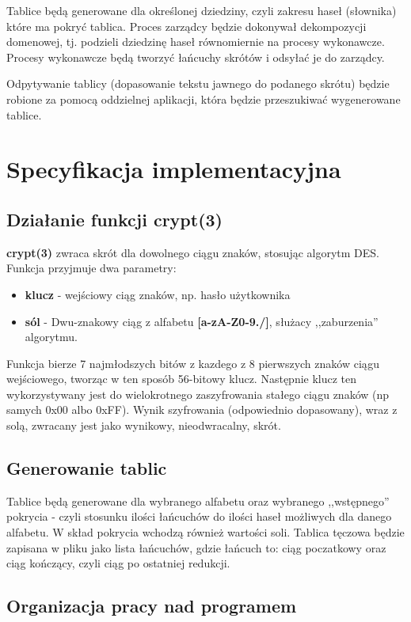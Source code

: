 \documentclass[a4paper,11pt]{article}
\begin{document}
Tablice będą generowane dla określonej dziedziny, czyli zakresu haseł (słownika) które ma pokryć tablica. Proces zarządcy będzie dokonywał dekompozycji domenowej, tj. podzieli dziedzinę haseł równomiernie na procesy wykonawcze. Procesy wykonawcze będą tworzyć łańcuchy skrótów i odsyłać je do zarządcy.

Odpytywanie tablicy (dopasowanie tekstu jawnego do podanego skrótu) będzie robione za pomocą oddzielnej aplikacji, która będzie przeszukiwać wygenerowane tablice.

\section{Specyfikacja implementacyjna}

\subsection{Działanie funkcji crypt(3)}

\textbf{crypt(3)} zwraca skrót dla dowolnego ciągu znaków, stosując algorytm DES. Funkcja przyjmuje dwa parametry:
\begin{itemize}
	\item \textbf{klucz} - wejściowy ciąg znaków, np. hasło użytkownika
	\item \textbf{sól} - Dwu-znakowy ciąg z alfabetu \textbf{[a-zA-Z0-9./]}, służacy ,,zaburzenia'' algorytmu.
\end{itemize}

Funkcja bierze 7 najmłodszych bitów z kazdego z 8 pierwszych znaków ciągu wejściowego, tworząc w ten sposób 56-bitowy klucz. Następnie klucz ten wykorzystywany jest do wielokrotnego zaszyfrowania stałego ciągu znaków (np samych 0x00 albo 0xFF). Wynik szyfrowania (odpowiednio dopasowany), wraz z solą, zwracany jest jako wynikowy, nieodwracalny, skrót.

\subsection{Generowanie tablic}

Tablice będą generowane dla wybranego alfabetu oraz wybranego ,,wstępnego'' pokrycia - czyli stosunku ilości łańcuchów do ilości haseł możliwych dla danego alfabetu. W skład pokrycia wchodzą również wartości soli. Tablica tęczowa będzie zapisana w pliku jako lista łańcuchów, gdzie łańcuch to: ciąg poczatkowy oraz ciąg kończący, czyli ciąg po ostatniej redukcji.

\subsection{Organizacja pracy nad programem}
\end{document}
